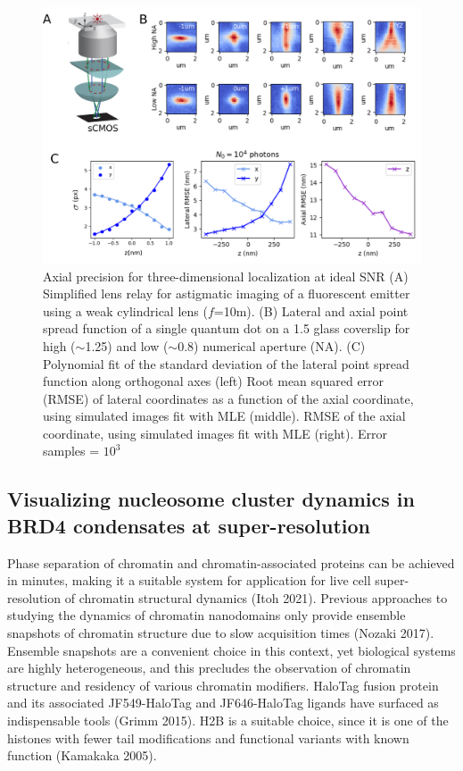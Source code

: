 \documentclass{ucetd}
\begin{document}
\begin{figure}
\begin{center}
\includegraphics[width=14cm]{Astigmatism.png}
\end{center}
\caption{Axial precision for three-dimensional localization at ideal SNR (A) Simplified lens relay for astigmatic imaging of a fluorescent emitter using a weak cylindrical lens ($f$=10m). (B) Lateral and axial point spread function of a single quantum dot on a 1.5 glass coverslip for high ($\sim$1.25) and low ($\sim$0.8) numerical aperture (NA). (C) Polynomial fit of the standard deviation of the lateral point spread function along orthogonal axes (left) Root mean squared error (RMSE) of lateral coordinates as a function of the axial coordinate, using simulated images fit with MLE (middle). RMSE of the axial coordinate, using simulated images fit with MLE (right). Error samples = $10^{3}$}
\end{figure}

\subsection{Visualizing nucleosome cluster dynamics in BRD4 condensates at super-resolution}

Phase separation of chromatin and chromatin-associated proteins can be achieved in minutes, making it a suitable system for application for live cell super-resolution of chromatin structural dynamics (Itoh 2021). Previous approaches to studying the dynamics of chromatin nanodomains only provide ensemble snapshots of chromatin structure due to slow acquisition times (Nozaki 2017). Ensemble snapshots are a convenient choice in this context, yet biological systems are highly heterogeneous, and this precludes the observation of chromatin structure and residency of various chromatin modifiers. HaloTag fusion protein and its associated JF549-HaloTag and JF646-HaloTag ligands have surfaced as indispensable tools (Grimm 2015). H2B is a suitable choice, since it is one of the histones with fewer tail modifications and functional variants with known function (Kamakaka 2005).
\end{document}
